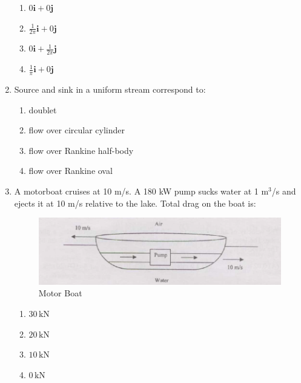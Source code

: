 \documentclass[journal,cmex10]{IEEEtran}
\theoremstyle{remark}
\numberwithin{equation}{enumi}
\numberwithin{figure}{enumi}
\begin{document}
\begin{enumerate}[label=\arabic*)]
\begin{enumerate}[label=\alph*)]
    \item $0\mathbf{i} + 0\mathbf{j}$
    \item $\frac{1}{2\pi} \mathbf{i} + 0 \mathbf{j}$
    \item $0 \mathbf{i} + \frac{1}{2\pi} \mathbf{j}$
    \item $\frac{1}{\pi} \mathbf{i} + 0 \mathbf{j}$
\end{enumerate}

\vspace{0.5cm}
\item Source and sink in a uniform stream correspond to:  
\hfill{}

\begin{enumerate}[label=\alph*)]
    \item doublet
    \item flow over circular cylinder
    \item flow over Rankine half-body
    \item flow over Rankine oval
\end{enumerate}

\vspace{0.5cm}
\item A motorboat cruises at 10 m/s. A 180 kW pump sucks water at 1 m$^3$/s and ejects it at 10 m/s relative to the lake. Total drag on the boat is:  

\begin{figure}[htbp]
  \centering
  \includegraphics[width=1.0\textwidth]{figs/D/fig3.png}
  \caption{Motor Boat}
  \label{D/fig3.png}
\end{figure}
\hfill{}

\begin{enumerate}[label=\alph*)]
    \item $30\,\text{kN}$
    \item $20\,\text{kN}$
    \item $10\,\text{kN}$
    \item $0\,\text{kN}$
\end{enumerate}


\end{enumerate}
\end{document}
